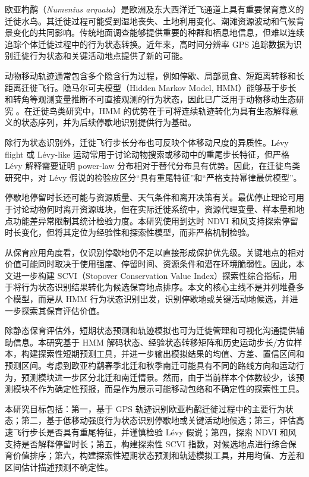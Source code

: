 \documentclass[UTF8,a4paper,12pt]{ctexart}
\begin{document}
欧亚杓鹬（\textit{Numenius arquata}）是欧洲及东大西洋迁飞通道上具有重要保育意义的迁徙水鸟。其迁徙过程可能受到湿地丧失、土地利用变化、潮滩资源波动和气候背景变化的共同影响。传统地面调查能够提供重要的种群和栖息地信息，但难以连续追踪个体迁徙过程中的行为状态转换。近年来，高时间分辨率 GPS 追踪数据为识别迁徙行为状态和关键活动地点提供了新的可能。

动物移动轨迹通常包含多个隐含行为过程，例如停歇、局部觅食、短距离转移和长距离迁徙飞行。隐马尔可夫模型（Hidden Markov Model, HMM）能够基于步长和转角等观测变量推断不可直接观测的行为状态，因此已广泛用于动物移动生态研究 \citep{michelot2016placeholder}。在迁徙鸟类研究中，HMM 的优势在于可将连续轨迹转化为具有生态解释意义的状态序列，并为后续停歇地识别提供行为基础。

除行为状态识别外，迁徙飞行步长分布也可反映个体移动尺度的异质性。L\'evy flight 或 L\'evy-like 运动常用于讨论动物搜索或移动中的重尾步长特征，但严格 L\'evy 解释需要证明 power-law 分布相对于替代分布具有优势。因此，在迁徙鸟类研究中，对 L\'evy 假说的检验应区分“具有重尾特征”和“严格支持幂律最优模型”。

停歇地停留时长还可能与资源质量、天气条件和离开决策有关。最优停止理论可用于讨论动物何时离开资源斑块，但在实际迁徙系统中，资源代理变量、样本量和地点功能差异常限制其统计检验力度。本研究使用到达时 NDVI 和风支持探索停留时长变化，但将其定位为经验性和探索性模型，而非严格机制检验。

从保育应用角度看，仅识别停歇地仍不足以直接形成保护优先级。关键地点的相对价值可能同时取决于使用强度、停留时间、资源条件和潜在环境脆弱性。因此，本文进一步构建 SCVI（Stopover Conservation Value Index）探索性综合指标，用于将行为状态识别结果转化为候选保育地点排序。本文的核心主线不是并列堆叠多个模型，而是从 HMM 行为状态识别出发，识别停歇地或关键活动地候选，并进一步探索其保育评估价值。

除静态保育评估外，短期状态预测和轨迹模拟也可为迁徙管理和可视化沟通提供辅助信息。本研究基于 HMM 解码状态、经验状态转移矩阵和历史运动步长/方位样本，构建探索性短期预测工具，并进一步输出模拟结果的均值、方差、置信区间和预测区间。考虑到欧亚杓鹬春季北迁和秋季南迁可能具有不同的路线方向和运动行为，预测模块进一步区分北迁和南迁情景。然而，由于当前样本个体数较少，该预测模块不作为确定性预报，而是作为展示可能移动包络和不确定性的探索性工具。

本研究目标包括：第一，基于 GPS 轨迹识别欧亚杓鹬迁徙过程中的主要行为状态；第二，基于低移动强度行为状态识别停歇地或关键活动地候选；第三，评估高速飞行步长是否具有重尾特征，并谨慎检验 L\'evy 假说；第四，探索 NDVI 和风支持是否解释停留时长；第五，构建探索性 SCVI 指数，对候选地点进行综合保育价值排序；第六，构建探索性短期状态预测和轨迹模拟工具，并用均值、方差和区间估计描述预测不确定性。
\end{document}
